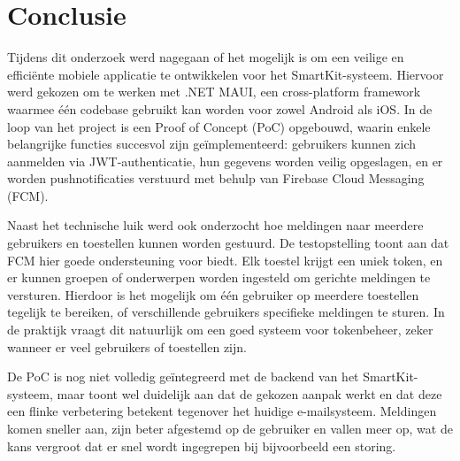 
\chapter{Conclusie}%
\label{ch:conclusie}


Tijdens dit onderzoek werd nagegaan of het mogelijk is om een veilige en efficiënte mobiele applicatie te ontwikkelen voor het SmartKit-systeem. Hiervoor werd gekozen om te werken met .NET MAUI, een cross-platform framework waarmee één codebase gebruikt kan worden voor zowel Android als iOS. In de loop van het project is een Proof of Concept (PoC) opgebouwd, waarin enkele belangrijke functies succesvol zijn geïmplementeerd: gebruikers kunnen zich aanmelden via JWT-authenticatie, hun gegevens worden veilig opgeslagen, en er worden pushnotificaties verstuurd met behulp van Firebase Cloud Messaging (FCM).

Naast het technische luik werd ook onderzocht hoe meldingen naar meerdere gebruikers en toestellen kunnen worden gestuurd. De testopstelling toont aan dat FCM hier goede ondersteuning voor biedt. Elk toestel krijgt een uniek token, en er kunnen groepen of onderwerpen worden ingesteld om gerichte meldingen te versturen. Hierdoor is het mogelijk om één gebruiker op meerdere toestellen tegelijk te bereiken, of verschillende gebruikers specifieke meldingen te sturen. In de praktijk vraagt dit natuurlijk om een goed systeem voor tokenbeheer, zeker wanneer er veel gebruikers of toestellen zijn.

De PoC is nog niet volledig geïntegreerd met de backend van het SmartKit-systeem, maar toont wel duidelijk aan dat de gekozen aanpak werkt en dat deze een flinke verbetering betekent tegenover het huidige e-mailsysteem. Meldingen komen sneller aan, zijn beter afgestemd op de gebruiker en vallen meer op, wat de kans vergroot dat er snel wordt ingegrepen bij bijvoorbeeld een storing.

